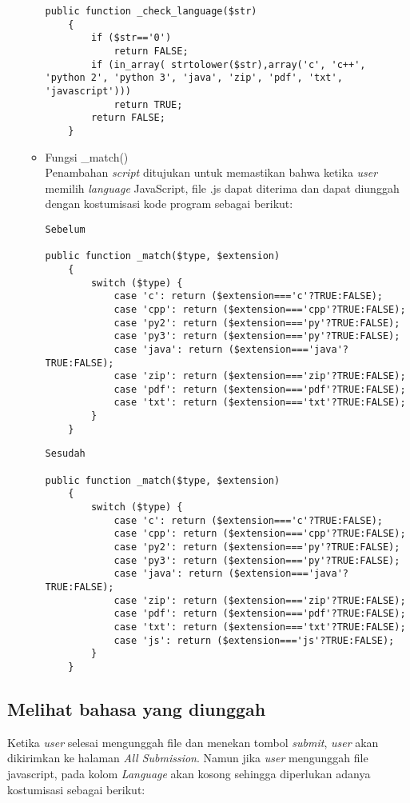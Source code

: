 \begin{itemize}
\begin{itemize}
\begin{lstlisting}[basicstyle=\ttfamily, frame=single,
    columns=fullflexible, breaklines=true, numbers=none]
	public function _check_language($str)
	{
		if ($str=='0')
			return FALSE;
		if (in_array( strtolower($str),array('c', 'c++', 'python 2', 'python 3', 'java', 'zip', 'pdf', 'txt', 'javascript')))
			return TRUE;
		return FALSE;
	}
    \end{lstlisting}
         
         \item Fungsi \_match()\\
         Penambahan \textit{script} ditujukan untuk memastikan bahwa ketika \textit{user} memilih \textit{language} JavaScript, file .js dapat diterima dan dapat diunggah dengan kostumisasi kode program sebagai berikut:
    \begin{lstlisting}[basicstyle=\ttfamily, frame=single,
    columns=fullflexible, breaklines=true, numbers=none]
Sebelum

public function _match($type, $extension)
	{
		switch ($type) {
			case 'c': return ($extension==='c'?TRUE:FALSE);
			case 'cpp': return ($extension==='cpp'?TRUE:FALSE);
			case 'py2': return ($extension==='py'?TRUE:FALSE);
			case 'py3': return ($extension==='py'?TRUE:FALSE);
			case 'java': return ($extension==='java'?TRUE:FALSE);
			case 'zip': return ($extension==='zip'?TRUE:FALSE);
			case 'pdf': return ($extension==='pdf'?TRUE:FALSE);
			case 'txt': return ($extension==='txt'?TRUE:FALSE);
		}
	}
    \end{lstlisting}
        \begin{lstlisting}[basicstyle=\ttfamily, frame=single,
    columns=fullflexible, breaklines=true, numbers=none]
Sesudah

public function _match($type, $extension)
	{
		switch ($type) {
			case 'c': return ($extension==='c'?TRUE:FALSE);
			case 'cpp': return ($extension==='cpp'?TRUE:FALSE);
			case 'py2': return ($extension==='py'?TRUE:FALSE);
			case 'py3': return ($extension==='py'?TRUE:FALSE);
			case 'java': return ($extension==='java'?TRUE:FALSE);
			case 'zip': return ($extension==='zip'?TRUE:FALSE);
			case 'pdf': return ($extension==='pdf'?TRUE:FALSE);
			case 'txt': return ($extension==='txt'?TRUE:FALSE);
			case 'js': return ($extension==='js'?TRUE:FALSE);
		}
	}
    \end{lstlisting}
     \end{itemize}
 \end{itemize}
 
 \subsection{Melihat bahasa yang diunggah}
 \label{sec: Meilihat bahasa yang diunggah}
 Ketika \textit{user} selesai mengunggah file dan menekan tombol \textit{submit}, \textit{user} akan dikirimkan ke halaman \textit{All Submission}. Namun jika \textit{user} mengunggah file javascript, pada kolom \textit{Language} akan kosong sehingga diperlukan adanya kostumisasi sebagai berikut: 
 
